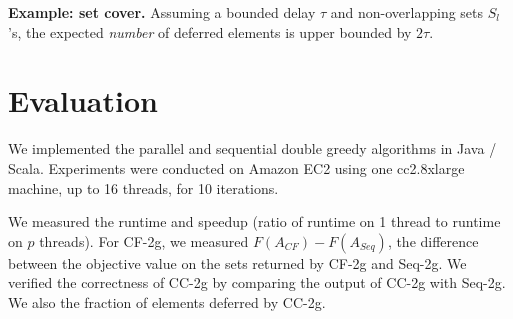 \documentclass{article} %
\newcommand{\hogwild}{CF-2g}
\newcommand{\occ}{CC-2g}
\newcommand{\seqalg}{Seq-2g}
\newcommand{\hogwildshort}{CF}
\newcommand{\seqalgshort}{Seq}
\begin{document}
\textbf{Example: set cover.}
Assuming a bounded delay $\tau$ and non-overlapping sets $S_l$'s, the expected \emph{number} of deferred elements is upper bounded by $2\tau$.

















\section{Evaluation \label{sec:evaluation}}

We implemented the parallel and sequential double greedy algorithms in Java / Scala.
Experiments were conducted on Amazon EC2 using one cc2.8xlarge machine, up to 16 threads, for 10 iterations.

We measured the runtime and speedup (ratio of runtime on 1 thread to runtime on $p$ threads).
For \hogwild{}, we measured $F(A_{\hogwildshort})-F(A_{\seqalgshort})$, the difference between the objective value on the sets returned by \hogwild{} and \seqalg{}.
We verified the correctness of \occ{} by comparing the output of \occ{} with \seqalg{}.
We also the fraction of elements deferred by \occ{}.

\end{document}
